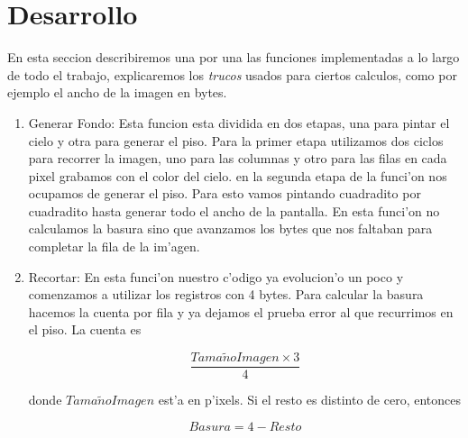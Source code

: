 \section{Desarrollo}
En esta seccion describiremos una por una las funciones implementadas a lo largo de todo el trabajo, explicaremos los \textit{trucos} usados para ciertos calculos, como por ejemplo el ancho de la imagen en bytes.

\begin{enumerate}
 \item Generar Fondo:
Esta funcion esta dividida en dos etapas, una para pintar el cielo y otra para generar el piso.
Para la primer etapa utilizamos dos ciclos para recorrer la imagen, uno para las columnas y otro para las filas en cada pixel grabamos con el color del cielo.
en la segunda etapa de la funci'on nos ocupamos de generar el piso.  Para esto vamos pintando cuadradito por cuadradito hasta generar todo el ancho de la pantalla.  En esta funci'on no calculamos la basura sino que avanzamos los bytes que nos faltaban para completar la fila de la im'agen.
\item Recortar:
En esta funci'on nuestro c'odigo ya evolucion'o un poco y comenzamos a utilizar los registros con 4 bytes.  Para calcular la basura hacemos la cuenta por fila y ya dejamos el prueba error al que recurrimos en el piso.  La cuenta es 

$$
\frac{Tama\tilde{n}oImagen \times 3}{4}
$$

donde $Tama\tilde{n}oImagen$ est'a en p'ixels.  Si el resto es distinto de cero, entonces 

$$
Basura = 4 - Resto
$$


\end{enumerate}

